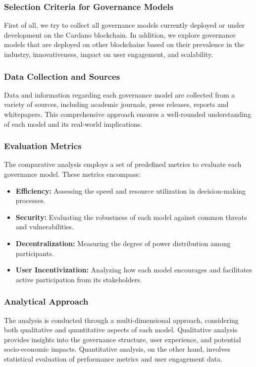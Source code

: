 \documentclass[11pt]{article}
\begin{document}
\subsubsection{Selection Criteria for Governance Models}

First of all, we try to collect all governance models currently deployed or under development on the Cardano blockchain.
In addition, we explore governance models that are deployed on other blockchains based on their prevalence in the industry, innovativeness, impact on user engagement, and scalability.

\subsubsection{Data Collection and Sources}
Data and information regarding each governance model are collected from a variety of sources, including academic journals, press releases, reports and whitepapers.
This comprehensive approach ensures a well-rounded understanding of each model and its real-world implications.

\subsubsection{Evaluation Metrics}
The comparative analysis employs a set of predefined metrics to evaluate each governance model.
These metrics encompass:

\begin{itemize}
    \item \textbf{Efficiency:} Assessing the speed and resource utilization in decision-making processes.
    \item \textbf{Security:} Evaluating the robustness of each model against common threats and vulnerabilities.
    \item \textbf{Decentralization:} Measuring the degree of power distribution among participants.
    \item \textbf{User Incentivization:} Analyzing how each model encourages and facilitates active participation from its stakeholders.
\end{itemize}

\subsubsection{Analytical Approach}
The analysis is conducted through a multi-dimensional approach, considering both qualitative and quantitative aspects of each model. Qualitative analysis provides insights into the governance structure, user experience, and potential socio-economic impacts. Quantitative analysis, on the other hand, involves statistical evaluation of performance metrics and user engagement data.
\end{document}
